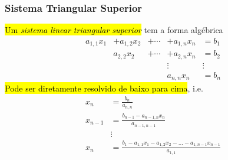 \subsubsection{Sistema Triangular Superior}

\hl{Um \emph{sistema linear triangular superior}} tem a forma algébrica
\begin{equation}
  \begin{matrix}
    a_{1,1}x_1 &+ a_{1,2}x_2 &+ \cdots &+ a_{1,n}x_n &= b_1\\
              &a_{2,2}x_2  &+ \cdots &+ a_{2,n}x_{n} &= b_2\\
              &&& \vdots  &\vdots \\
              &&& a_{n,n}x_n &= b_n
  \end{matrix}
\end{equation}
\hl{Pode ser diretamente resolvido de baixo para cima}, i.e.
\begin{align}
  x_n &= \frac{b_n}{a_{n,n}}\\
  x_{n-1} &= \frac{b_{n-1} - a_{n-1,n}x_n}{a_{n-1,n-1}}\\
      &\vdots\\
  x_n &= \frac{b_1 - a_{1,1}x_1 - a_{1,2}x_2 - \ldots - a_{1,n-1}x_{n-1}}{a_{1,1}}
\end{align}

